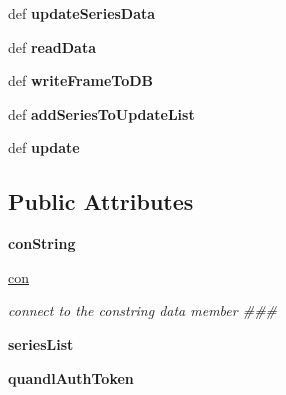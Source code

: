 \begin{DoxyCompactItemize}
\item 
\hypertarget{classDataDownloader_1_1DataDownloader_a91c7750d6a68bf0ee6ec64a07e7229cc}{def {\bfseries update\-Series\-Data}}\label{classDataDownloader_1_1DataDownloader_a91c7750d6a68bf0ee6ec64a07e7229cc}

\item 
\hypertarget{classDataDownloader_1_1DataDownloader_a5b8d10b7568136347dfd7b6f9b10c681}{def {\bfseries read\-Data}}\label{classDataDownloader_1_1DataDownloader_a5b8d10b7568136347dfd7b6f9b10c681}

\item 
\hypertarget{classDataDownloader_1_1DataDownloader_ac58f29f5e322abcc0c130695bd563ab7}{def {\bfseries write\-Frame\-To\-D\-B}}\label{classDataDownloader_1_1DataDownloader_ac58f29f5e322abcc0c130695bd563ab7}

\item 
\hypertarget{classDataDownloader_1_1DataDownloader_a02fa4247b7fb2def7c6b4b680dd2591f}{def {\bfseries add\-Series\-To\-Update\-List}}\label{classDataDownloader_1_1DataDownloader_a02fa4247b7fb2def7c6b4b680dd2591f}

\item 
\hypertarget{classDataDownloader_1_1DataDownloader_ad396ff468ca7cc92850f95d009cb7c61}{def {\bfseries update}}\label{classDataDownloader_1_1DataDownloader_ad396ff468ca7cc92850f95d009cb7c61}

\end{DoxyCompactItemize}
\subsection*{\-Public \-Attributes}
\begin{DoxyCompactItemize}
\item 
\hypertarget{classDataDownloader_1_1DataDownloader_ab58e8897855468022be0346ce8c73f37}{{\bfseries con\-String}}\label{classDataDownloader_1_1DataDownloader_ab58e8897855468022be0346ce8c73f37}

\item 
\hypertarget{classDataDownloader_1_1DataDownloader_af326eb2d6c4ba8badd4a4cd331b47285}{\hyperlink{classDataDownloader_1_1DataDownloader_af326eb2d6c4ba8badd4a4cd331b47285}{con}}\label{classDataDownloader_1_1DataDownloader_af326eb2d6c4ba8badd4a4cd331b47285}

\begin{DoxyCompactList}\small\item\em connect to the constring data member \#\#\# \end{DoxyCompactList}\item 
\hypertarget{classDataDownloader_1_1DataDownloader_a73e785da899d8431c0a3ced90bb56dd4}{{\bfseries series\-List}}\label{classDataDownloader_1_1DataDownloader_a73e785da899d8431c0a3ced90bb56dd4}

\item 
\hypertarget{classDataDownloader_1_1DataDownloader_a15e9ce8379ed30572c00b06cdf25a29d}{{\bfseries quandl\-Auth\-Token}}\label{classDataDownloader_1_1DataDownloader_a15e9ce8379ed30572c00b06cdf25a29d}

\end{DoxyCompactItemize}


